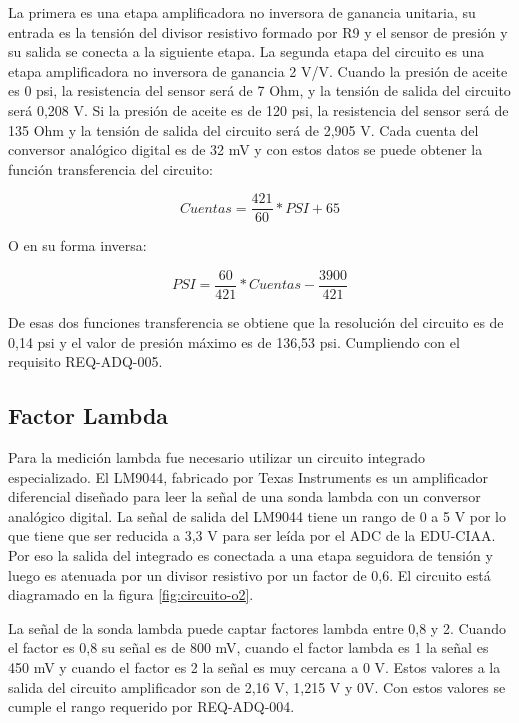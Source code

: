 La primera es una etapa amplificadora no inversora de ganancia unitaria, su entrada es la tensión del divisor resistivo formado por R9 y el sensor de presión y su salida se conecta a la siguiente etapa. La segunda etapa del circuito es una etapa amplificadora no inversora de ganancia 2 V/V.
Cuando la presión de aceite es 0 psi, la resistencia del sensor será de 7 Ohm, y la tensión de salida del circuito será 0,208 V. Si la presión de aceite es de 120 psi, la resistencia del sensor será de 135 Ohm y la tensión de salida del circuito será de 2,905 V. Cada cuenta del conversor analógico digital es de 32 mV y con estos datos se puede obtener la función transferencia del circuito:

\[ Cuentas = \frac{421}{60} * PSI + 65\]

O en su forma inversa:

\[ PSI = \frac{60}{421} * Cuentas - \frac{3900}{421} \]

De esas dos funciones transferencia se obtiene que la resolución del circuito es de 0,14 psi y el valor de presión máximo es de 136,53 psi. Cumpliendo con el requisito REQ-ADQ-005.

\subsection{Factor Lambda}

Para la medición lambda fue necesario utilizar un circuito integrado especializado. El LM9044, fabricado por Texas Instruments es un amplificador diferencial diseñado para leer la señal de una sonda lambda con un conversor analógico digital. La señal de salida del LM9044 tiene un rango de 0 a 5 V por lo que tiene que ser reducida a 3,3 V para ser leída por el ADC de la EDU-CIAA. Por eso la salida del integrado es conectada a una etapa seguidora de tensión y luego es atenuada por un divisor resistivo por un factor de 0,6. El circuito está diagramado en la figura \ref{fig:circuito-o2}.

La señal de la sonda lambda puede captar factores lambda entre 0,8 y 2. Cuando el factor es 0,8 su señal es de 800 mV, cuando el factor lambda es 1 la señal es 450 mV y cuando el factor es 2 la señal es muy cercana a 0 V. Estos valores a la salida del circuito amplificador son de 2,16 V, 1,215 V y 0V. Con estos valores se cumple el rango requerido por REQ-ADQ-004.

